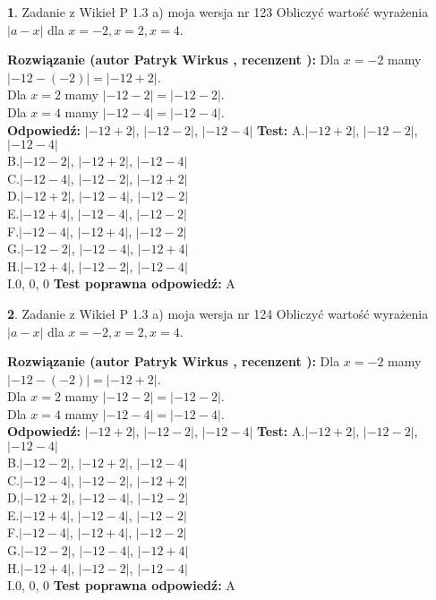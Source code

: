 \documentclass[12pt, a4paper]{article}
\theoremstyle{definition} %
\newtheorem{zad}{}
\newcommand{\zadStart}[1]{\begin{zad}#1\newline}
\newcommand{\zadStop}{\end{zad}}
\newcommand{\rozwStart}[2]{\noindent \textbf{Rozwiązanie (autor #1 , recenzent #2): }\newline}
\newcommand{\rozwStop}{\newline}
\newcommand{\odpStart}{\noindent \textbf{Odpowiedź:}\newline}
\newcommand{\odpStop}{\newline}
\newcommand{\testStart}{\noindent \textbf{Test:}\newline}
\newcommand{\testStop}{\newline}
\newcommand{\kluczStart}{\noindent \textbf{Test poprawna odpowiedź:}\newline}
\newcommand{\kluczStop}{\newline}
\begin{document}
\zadStart{Zadanie z Wikieł P 1.3 a) moja wersja nr 123}
Obliczyć wartość wyrażenia $|a - x|$ dla $x=-2,x=2,x=4$.
\zadStop
\rozwStart{Patryk Wirkus}{}
Dla $x = -2$ mamy $|-12 - (-2)| = |-12 + 2|$.\\
Dla $x = 2$ mamy $|-12 - 2| = |-12 - 2|$.\\
Dla $x = 4$ mamy $|-12 - 4| = |-12 - 4|$.\\
\rozwStop
\odpStart
$|-12 + 2|$, $|-12 - 2|$, $|-12 - 4|$
\odpStop
\testStart
A.$|-12 + 2|$, $|-12 - 2|$, $|-12 - 4|$\\
B.$|-12 - 2|$, $|-12 + 2|$, $|-12 - 4|$\\
C.$|-12 - 4|$, $|-12 - 2|$, $|-12 + 2|$\\
D.$|-12 + 2|$, $|-12 - 4|$, $|-12 - 2|$\\
E.$|-12 + 4|$, $|-12 - 4|$, $|-12 - 2|$\\
F.$|-12 - 4|$, $|-12 + 4|$, $|-12 - 2|$\\
G.$|-12 - 2|$, $|-12 - 4|$, $|-12 + 4|$\\
H.$|-12 + 4|$, $|-12 - 2|$, $|-12 - 4|$\\
I.$0$, $0$, $0$
\testStop
\kluczStart
A
\kluczStop



\zadStart{Zadanie z Wikieł P 1.3 a) moja wersja nr 124}
Obliczyć wartość wyrażenia $|a - x|$ dla $x=-2,x=2,x=4$.
\zadStop
\rozwStart{Patryk Wirkus}{}
Dla $x = -2$ mamy $|-12 - (-2)| = |-12 + 2|$.\\
Dla $x = 2$ mamy $|-12 - 2| = |-12 - 2|$.\\
Dla $x = 4$ mamy $|-12 - 4| = |-12 - 4|$.\\
\rozwStop
\odpStart
$|-12 + 2|$, $|-12 - 2|$, $|-12 - 4|$
\odpStop
\testStart
A.$|-12 + 2|$, $|-12 - 2|$, $|-12 - 4|$\\
B.$|-12 - 2|$, $|-12 + 2|$, $|-12 - 4|$\\
C.$|-12 - 4|$, $|-12 - 2|$, $|-12 + 2|$\\
D.$|-12 + 2|$, $|-12 - 4|$, $|-12 - 2|$\\
E.$|-12 + 4|$, $|-12 - 4|$, $|-12 - 2|$\\
F.$|-12 - 4|$, $|-12 + 4|$, $|-12 - 2|$\\
G.$|-12 - 2|$, $|-12 - 4|$, $|-12 + 4|$\\
H.$|-12 + 4|$, $|-12 - 2|$, $|-12 - 4|$\\
I.$0$, $0$, $0$
\testStop
\kluczStart
A
\kluczStop
\end{document}
